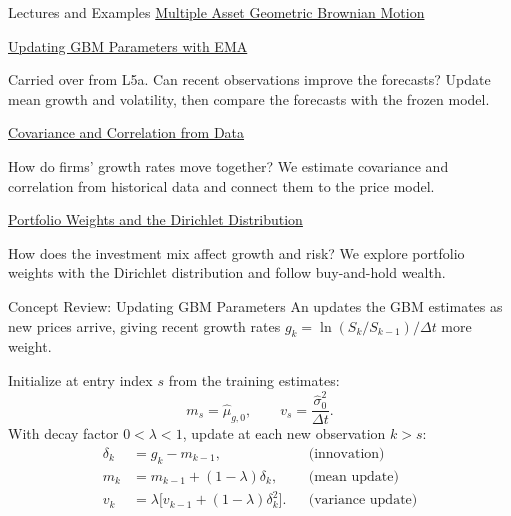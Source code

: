 \documentclass[aspectratio=169,11pt]{beamer}
\begin{document}
\begin{frame}[t]{Lectures and Examples}
\small
\textbf{}
  \href{https://github.com/varnerlab/CHEME-5660-CourseRepository-Fall-2026/blob/main/lectures/week-5/L5b/CHEME-5660-L5b-Lecture-MultipleAsset-GBM-Fall-2026.ipynb}{Multiple Asset Geometric Brownian Motion}

  \vspace{0.4em}
  \textbf{}
  \href{https://github.com/varnerlab/CHEME-5660-CourseRepository-Fall-2026/blob/main/lectures/week-5/L5a/CHEME-5660-L5a-Example-EMA-SAGBM-Fall-2026.ipynb}{Updating GBM Parameters with EMA}

  Carried over from L5a. Can recent observations improve the forecasts? Update
  mean growth and volatility, then compare the forecasts with the frozen model.

  \vspace{0.4em}
  \textbf{}
  \href{https://github.com/varnerlab/CHEME-5660-CourseRepository-Fall-2026/blob/main/lectures/week-5/L5b/CHEME-5660-L5b-Example-CovarianceMatrix-Fall-2026.ipynb}{Covariance and Correlation from Data}

  How do firms' growth rates move together? We estimate covariance and
  correlation from historical data and connect them to the price model.

  \vspace{0.4em}
  \textbf{}
  \href{https://github.com/varnerlab/CHEME-5660-CourseRepository-Fall-2026/blob/main/lectures/week-5/L5b/CHEME-5660-L5b-Example-Dirichlet-PortfolioWeights-Fall-2026.ipynb}{Portfolio Weights and the Dirichlet Distribution}

  How does the investment mix affect growth and risk? We explore portfolio
  weights with the Dirichlet distribution and follow buy-and-hold wealth.
\end{frame}

\begin{frame}{Concept Review: Updating GBM Parameters}
An  updates the GBM estimates as
new prices arrive, giving recent growth rates $g_k=\ln(S_k/S_{k-1})/\Delta t$
more weight.

\vspace{0.5em}
Initialize at entry index $s$ from the training estimates:
\[
  m_s=\hat\mu_{g,0},\qquad v_s=\frac{\hat\sigma_0^2}{\Delta t}.
\]
With decay factor $0<\lambda<1$, update at each new observation $k>s$:
\[
\begin{aligned}
  \delta_k &= g_k-m_{k-1}, &&\text{(innovation)}\\
  m_k &= m_{k-1}+(1-\lambda)\delta_k, &&\text{(mean update)}\\
  v_k &= \lambda\bigl[v_{k-1}+(1-\lambda)\delta_k^2\bigr]. &&\text{(variance update)}
\end{aligned}
\]
\end{frame}
\end{document}
